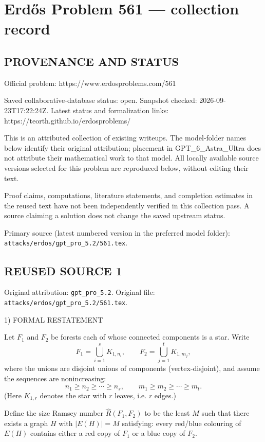 \section*{Erd\H{o}s Problem 561 --- collection record}

\subsection*{PROVENANCE AND STATUS}
Official problem: https://www.erdosproblems.com/561

Saved collaborative-database status: open.
Snapshot checked: 2026-09-23T17:22:24Z.
Latest status and formalization links: https://teorth.github.io/erdosproblems/

This is an attributed collection of existing writeups. The model-folder names below identify their original attribution; placement in GPT\_6\_Astra\_Ultra does not attribute their mathematical work to that model. All locally available source versions selected for this problem are reproduced below, without editing their text.

Proof claims, computations, literature statements, and completion estimates in the reused text have not been independently verified in this collection pass. A source claiming a solution does not change the saved upstream status.

Primary source (latest numbered version in the preferred model folder): \texttt{attacks/erdos/gpt\_pro\_5.2/561.tex}.

\subsection*{REUSED SOURCE 1}
Original attribution: \texttt{gpt\_pro\_5.2}.
Original file: \texttt{attacks/erdos/gpt\_pro\_5.2/561.tex}.


1) FORMAL RESTATEMENT

Let $F_1$ and $F_2$ be forests each of whose connected components is a star.
Write
\[
F_1=\bigcup_{i=1}^s K_{1,n_i},\qquad F_2=\bigcup_{j=1}^t K_{1,m_j},
\]
where the unions are disjoint unions of components (vertex-disjoint), and assume the sequences are nonincreasing:
\[
n_1\ge n_2\ge \cdots \ge n_s,\qquad m_1\ge m_2\ge \cdots \ge m_t.
\]
(Here $K_{1,r}$ denotes the star with $r$ leaves, i.e. $r$ edges.)

Define the size Ramsey number $\hat R(F_1,F_2)$ to be the least $M$ such that there exists a graph $H$ with $|E(H)|=M$ satisfying: every red/blue colouring of $E(H)$ contains either a red copy of $F_1$ or a blue copy of $F_2$.

